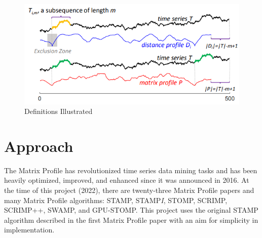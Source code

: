 \documentclass[conference]{IEEEtran}
\begin{document}
\begin{figure}
\begin{center}
\includegraphics[scale=0.40]{definitions_illustrated.png}
\caption{Definitions Illustrated}
\label{fig:DefinitionsIllustrated}
\end{center}
\end{figure}

\section{Approach}
The Matrix Profile has revolutionized time series data mining tasks and has been heavily optimized, improved, and enhanced since it was announced in 2016.  At the time of this project (2022), there are twenty-three Matrix Profile papers\cite{Keogh} and many Matrix Profile algorithms: STAMP, STAMP\emph{I}, STOMP, SCRIMP, SCRIMP++, SWAMP, and GPU-STOMP.  This project uses the original STAMP algorithm described in the first Matrix Profile paper\cite{MatrixProfile1} with an aim for simplicity in implementation.
\end{document}
